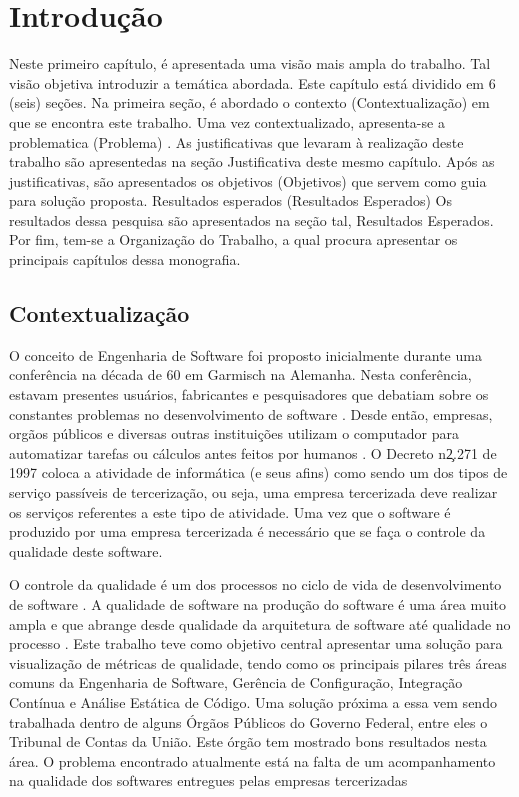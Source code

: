 \chapter[Introdução]{Introdução}
	Neste primeiro capítulo, é apresentada uma visão mais ampla do trabalho. Tal visão objetiva introduzir a temática abordada. Este capítulo está dividido em 6 (seis) seções. Na primeira seção, é abordado o contexto (Contextualização) em que se encontra este trabalho. Uma vez contextualizado, apresenta-se a problematica (Problema) . As justificativas que levaram à realização deste trabalho são apresentedas na seção Justificativa deste mesmo capítulo. Após as justificativas, são apresentados os objetivos (Objetivos) que servem como guia para solução proposta. Resultados esperados (Resultados Esperados) Os resultados dessa pesquisa  são apresentados na seção tal, Resultados Esperados. Por fim, tem-se a Organização do Trabalho, a qual procura apresentar os principais capítulos dessa monografia.


\section{Contextualização}
	O conceito de Engenharia de Software foi proposto inicialmente durante uma conferência na década de 60 em Garmisch na Alemanha. Nesta conferência, estavam presentes usuários, fabricantes e pesquisadores que debatiam sobre os constantes problemas no desenvolvimento de software \cite{Paduelli}. Desde então, empresas, orgãos públicos e diversas outras instituições utilizam o computador para automatizar tarefas ou cálculos antes feitos por humanos \cite{fonseca2007historia}. O Decreto n\c 2.271 de 1997 \cite{decreto_2271} coloca a atividade de informática (e seus afins) como sendo um dos tipos de serviço passíveis de tercerização, ou seja, uma empresa tercerizada deve realizar os serviços referentes a este tipo de atividade. Uma vez que o software é produzido por uma empresa tercerizada é necessário que se faça o controle da qualidade deste software.

O controle da qualidade é um dos processos no ciclo de vida de desenvolvimento de software \cite{machado_metricas_2004}. A qualidade de software na produção do software é uma área muito ampla e que abrange desde qualidade da arquitetura de software até qualidade no processo . Este trabalho teve como objetivo central apresentar uma solução para visualização de métricas de qualidade, tendo como os principais pilares três áreas comuns da Engenharia de Software, Gerência de Configuração, Integração Contínua e Análise Estática de Código. Uma solução próxima a essa vem sendo trabalhada dentro de alguns Órgãos Públicos do Governo Federal, entre eles o Tribunal de Contas da União. Este órgão tem mostrado bons resultados nesta área. O problema encontrado atualmente está na falta de um acompanhamento na qualidade dos softwares entregues pelas empresas tercerizadas 	


